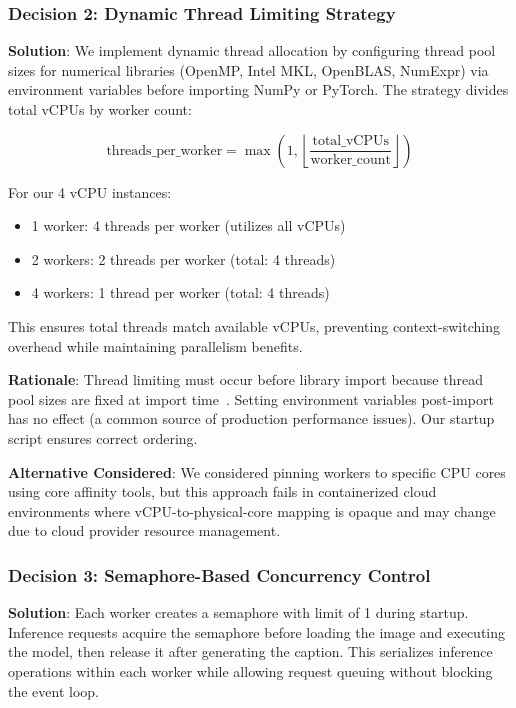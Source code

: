 \subsubsection{Decision 2: Dynamic Thread Limiting Strategy}

\textbf{Solution}: We implement dynamic thread allocation by configuring thread pool sizes for numerical libraries (OpenMP, Intel MKL, OpenBLAS, NumExpr) via environment variables before importing NumPy or PyTorch. The strategy divides total vCPUs by worker count:

\[
\text{threads\_per\_worker} = \max\left(1, \left\lfloor\frac{\text{total\_vCPUs}}{\text{worker\_count}}\right\rfloor\right)
\]

For our 4 vCPU instances:
\begin{itemize}
\item 1 worker: 4 threads per worker (utilizes all vCPUs)
\item 2 workers: 2 threads per worker (total: 4 threads)
\item 4 workers: 1 thread per worker (total: 4 threads)
\end{itemize}

This ensures total threads match available vCPUs, preventing context-switching overhead while maintaining parallelism benefits.

\textbf{Rationale}: Thread limiting must occur before library import because thread pool sizes are fixed at import time~\cite{intel2023mkl}. Setting environment variables post-import has no effect (a common source of production performance issues). Our startup script ensures correct ordering.

\textbf{Alternative Considered}: We considered pinning workers to specific CPU cores using core affinity tools, but this approach fails in containerized cloud environments where vCPU-to-physical-core mapping is opaque and may change due to cloud provider resource management.

\subsubsection{Decision 3: Semaphore-Based Concurrency Control}

\textbf{Solution}: Each worker creates a semaphore with limit of 1 during startup. Inference requests acquire the semaphore before loading the image and executing the model, then release it after generating the caption. This serializes inference operations within each worker while allowing request queuing without blocking the event loop.


